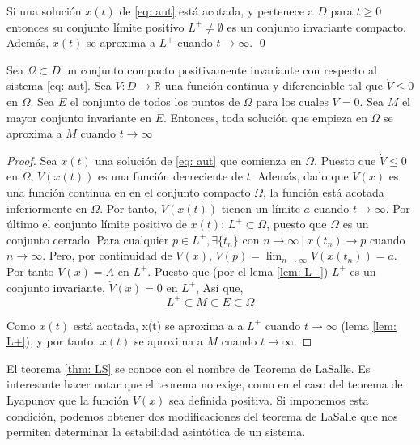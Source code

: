 \begin{lemma}\label{lem: L+}
Si una solución $x(t)$ de \ref{eq: aut}  está acotada, y pertenece a $D$ para $t \geq 0$ entonces su conjunto límite positivo  $L^+ \neq \emptyset$ es un conjunto invariante compacto. Además, $x(t)$ se aproxima a $L^+$ cuando $t \to \infty$.
\qed
\end{lemma}

\begin{theorem}\label{thm: LS}
Sea $\Omega \subset D$ un conjunto compacto positivamente invariante  con respecto al sistema \ref{eq: aut}. Sea $V:D\to \mathbb{R}$ una función continua y diferenciable tal que $\dot V \leq 0$ en $\Omega$. Sea $E$ el conjunto de todos los puntos de $\Omega$ para los cuales $\dot V = 0$. Sea $M$ el mayor conjunto invariante en $E$. Entonces, toda solución que empieza en $\Omega$ se aproxima a $M$ cuando $t\to \infty$
\end{theorem}
\begin{proof}
Sea $x(t)$ una solución de \ref{eq: aut} que comienza en $\Omega$,  Puesto que $\dot V\leq 0$ en $\Omega$, $V(x(t))$ es una función decreciente de $t$. Además, dado que $V(x)$ es una función continua en en el conjunto compacto $\Omega$, la función está acotada inferiormente en $\Omega$. Por tanto,  $V(x(t))$ tienen un límite $a$ cuando $t\to \infty$. Por último el conjunto límite positivo de $x(t)$: $L^+ \subset \Omega$, puesto que $	\Omega$ es un conjunto cerrado.  Para cualquier $p \in L^+, \exists \{t_n\}$ con $n\to \infty \ | \ x(t_n)\to p$ cuando $n\to \infty$. Pero, por continuidad de $V(x)$, $V(p)= \lim_{n\to \infty }V(x(t_n))=a$. Por tanto $V(x)=A$ en $L^+$. Puesto que (por el lema \ref{lem: L+}) $L^+$ es un conjunto invariante, $\dot V(x) = 0$ en $L^+$, Así que,
\begin{equation*}
L^+ \subset M \subset E \subset \Omega 
\end{equation*} 

Como $x(t)$ está acotada, x(t) se aproxima a a $L^+$ cuando $t\to \infty$ (lema \ref{lem: L+}), y por tanto, $x(t)$ se aproxima a $M$ cuando $t\to \infty$. 
\end{proof}

El teorema \ref{thm: LS} se conoce con el nombre de Teorema de LaSalle. Es interesante hacer notar que el teorema no exige, como en el caso del teorema de Lyapunov que la función $V(x)$ sea definida positiva. Si imponemos esta condición, podemos obtener dos modificaciones del teorema de LaSalle que nos permiten determinar la estabilidad asintótica de un sistema.

